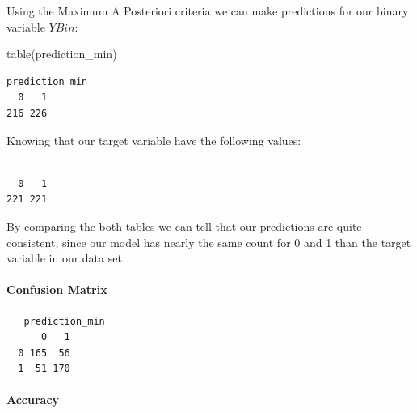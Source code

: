 \documentclass[
]{article}
\newenvironment{Shaded}{\begin{snugshade}}{\end{snugshade}}
\newcommand{\FunctionTok}[1]{\textcolor[rgb]{0.00,0.00,0.00}{#1}}
\newcommand{\NormalTok}[1]{#1}
\newcommand{\OtherTok}[1]{\textcolor[rgb]{0.56,0.35,0.01}{#1}}
\newcommand{\SpecialCharTok}[1]{\textcolor[rgb]{0.00,0.00,0.00}{#1}}
\begin{document}
Using the Maximum A Posteriori criteria we can make predictions for our
binary variable \(YBin\):

\begin{Shaded}
\begin{Highlighting}[]
\FunctionTok{table}\NormalTok{(prediction\_min)}
\end{Highlighting}
\end{Shaded}

\begin{verbatim}
prediction_min
  0   1 
216 226 
\end{verbatim}

Knowing that our target variable have the following values:

\begin{Shaded}
\end{Shaded}

\begin{verbatim}

  0   1 
221 221 
\end{verbatim}

By comparing the both tables we can tell that our predictions are quite
consistent, since our model has nearly the same count for 0 and 1 than
the target variable in our data set.

\hypertarget{confusion-matrix-1}{%
\paragraph{Confusion Matrix}\label{confusion-matrix-1}}

\begin{Shaded}
\end{Shaded}

\begin{verbatim}
   prediction_min
      0   1
  0 165  56
  1  51 170
\end{verbatim}

\hypertarget{accuracy-1}{%
\paragraph{Accuracy}\label{accuracy-1}}
\end{document}
